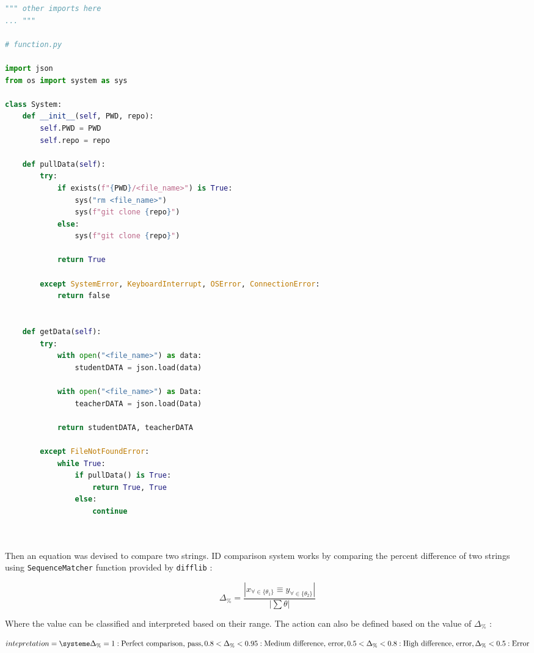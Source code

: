 \documentclass{article}
\begin{document}
\begin{center}
    \begin{lstlisting}[language=Python]
""" other imports here
... """

# function.py

import json
from os import system as sys
    
class System:    
    def __init__(self, PWD, repo):
        self.PWD = PWD
        self.repo = repo
    
    def pullData(self):
        try:
            if exists(f"{PWD}/<file_name>") is True:
                sys("rm <file_name>")
                sys(f"git clone {repo}") 
            else:
                sys(f"git clone {repo}")
        
            return True
            
        except SystemError, KeyboardInterrupt, OSError, ConnectionError:
            return false


    def getData(self):
        try:
            with open("<file_name>") as data:
                studentDATA = json.load(data)
            
            with open("<file_name>") as Data:
                teacherDATA = json.load(Data)

            return studentDATA, teacherDATA
        
        except FileNotFoundError:
            while True:
                if pullData() is True:
                    return True, True
                else:
                    continue

         
    \end{lstlisting}
\end{center}

Then an equation was devised to compare two strings. ID comparison system works by comparing the percent difference of two strings using \texttt{SequenceMatcher} function provided by \texttt{difflib} :

    \begin{equation*}
        \Delta_\% = \frac{|x_{\forall \in \{\theta_1\}} \equiv y_{\forall \in \{ \theta_2\}}|}{|\sum \theta|}
    \end{equation*}

Where the value can be classified and interpreted based on their range. The action can also be defined based on the value of $\Delta_\%$ :

    \begin{equation}
        intepretation = \systeme{\Delta_\% = 1 : \text{Perfect comparison, pass}, 0.8 < \Delta_\% < 0.95 : \text{Medium difference, error},
            0.5 < \Delta_\% < 0.8 : \text{High difference, error},
            \Delta_\% < 0.5 : \text{Error}}
    \end{equation}
\end{document}
